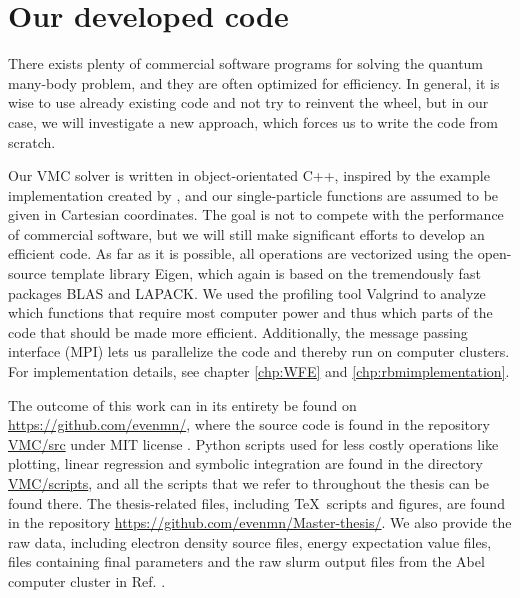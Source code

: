 \section{Our developed code}
There exists plenty of commercial software programs for solving the quantum many-body problem, and they are often optimized for efficiency. In general, it is wise to use already existing code and not try to reinvent the wheel, but in our case, we will investigate a new approach, which forces us to write the code from scratch. 

Our VMC solver is written in object-orientated C++, inspired by the example implementation created by \citet{ledum_simple_2016}, and our single-particle functions are assumed to be given in Cartesian coordinates. The goal is not to compete with the performance of commercial software, but we will still make significant efforts to develop an efficient code. As far as it is possible, all operations are vectorized using the open-source template library Eigen, which again is based on the tremendously fast packages BLAS and LAPACK. We used the profiling tool Valgrind to analyze which functions that require most computer power and thus which parts of the code that should be made more efficient. Additionally, the message passing interface (MPI) lets us parallelize the code and thereby run on computer clusters. For implementation details, see chapter \ref{chp:WFE} and \ref{chp:rbmimplementation}. 

The outcome of this work can in its entirety be found on \url{https://github.com/evenmn/}, where the source code is found in the repository \href{https://github.com/evenmn/VMC/tree/master/src}{VMC/src} under MIT license \supercite{noauthor_mit_nodate}. Python scripts used for less costly operations like plotting, linear regression and symbolic integration are found in the directory \href{https://github.com/evenmn/VMC/tree/master/scripts}{VMC/scripts}, and all the scripts that we refer to throughout the thesis can be found there. The thesis-related files, including \TeX\, scripts and figures, are found in the repository \url{https://github.com/evenmn/Master-thesis/}. We also provide the raw data, including electron density source files, energy expectation value files, files containing final parameters and the raw slurm output files from the Abel computer cluster in Ref. \cite{nordhagen_even_marius_2019_3477946}.

